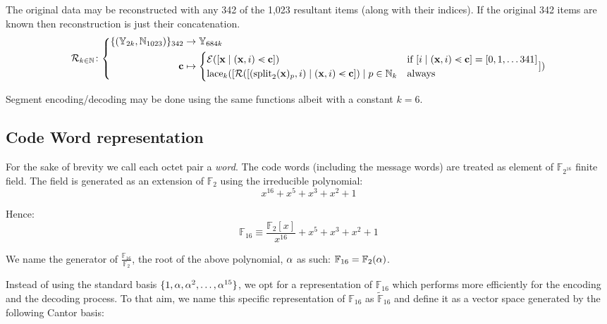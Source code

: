The original data may be reconstructed with any 342 of the 1,023 resultant items (along with their indices). If the original 342 items are known then reconstruction is just their concatenation.
\begin{equation}\label{eq:erasurecodinginv}
  \mathcal{R}_{k \in \N}\colon\left\{\begin{aligned}
    \{(\Y_{2k}, \N_{1023})\}_{342} &\to \Y_{684k} \\
    \mathbf{c} &\mapsto \begin{cases}
      \se([\mathbf{x} \mid (\mathbf{x}, i) \orderedin \mathbf{c}]) &\when [i \mid (\mathbf{x}, i) \orderedin \mathbf{c}] = [0, 1, \dots 341]\\
      \lace_k([
        \mathcal{R}([(\spl_2(\mathbf{x})_p, i) \mid (\mathbf{x}, i) \orderedin \mathbf{c}])
      \mid p \in \N_k &\text{always}\\
    \end{cases}
    ])
  \end{aligned}\right.
\end{equation}



Segment encoding/decoding may be done using the same functions albeit with a constant $k = 6$.

\subsection{Code Word representation}

For the sake of brevity we call each octet pair a \emph{word}. The code words (including the message words) are treated as element of $\mathbb{F}_{2^{16}}$ finite field. The field is generated as an extension of $\mathbb{F}_2$ using the irreducible polynomial:
\begin{equation}
x^{16} + x^5 + x^3 + x^2 + 1
\end{equation}

Hence:
\begin{equation}
\mathbb{F}_{16} \equiv \frac{\mathbb{F}_2[x]}{x^{16}} + x^5 + x^3 + x^2 + 1
\end{equation}

We name the generator of $\frac{\mathbb{F}_{16}}{\mathbb{F}_2}$, the root of the above polynomial, $\alpha$ as such: $\mathbb{F}_{16} = \mathbb{F}_2(\alpha)$.

Instead of using the standard basis $\{1, \alpha, \alpha^2, \dots, \alpha^{15}\}$, we opt for a representation of $\mathbb{F}_{16}$ which performs more efficiently for the encoding and the decoding process. To that aim, we name this specific representation of $\mathbb{F}_{16}$ as $\tilde{\mathbb{F}}_{16}$ and define it as a vector space generated by the following Cantor basis:

